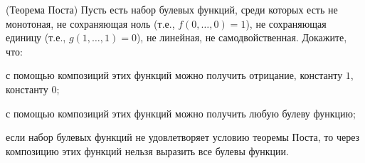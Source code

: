 (Теорема Поста) Пусть есть набор булевых функций, среди которых есть не монотоная, не сохраняющая ноль
(т.е., $f(0, \dots, 0) = 1$), не сохраняющая единицу (т.е., $g(1, \dots, 1) = 0$), не линейная, не
самодвойственная. Докажите, что:
\begin{enumcyr}
    \item с помощью композиций этих функций можно получить отрицание, константу $1$, константу $0$;
    \item с помощью композиций этих функций можно получить любую булеву функцию;
    \item если набор булевых функций не удовлетворяет условию теоремы Поста, то через композицию этих
        функций нельзя выразить все булевы функции.
\end{enumcyr}